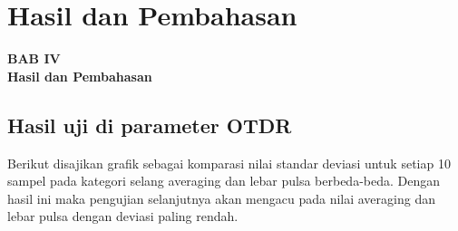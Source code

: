 \documentclass[12pt]{article}
\begin{document}
%	
	
\newpage

	\setcounter{figure}{0}
	
	\section{Hasil dan Pembahasan}
	
	\begin{center}
		{\large \textbf{BAB IV}} \\
		{\large \textbf{Hasil dan Pembahasan}}
	\end{center}
	
	\subsection{Hasil uji di parameter OTDR}
	
	Berikut disajikan grafik sebagai komparasi nilai standar deviasi untuk setiap 10 sampel pada kategori selang averaging dan lebar pulsa berbeda-beda.
	Dengan hasil ini maka pengujian selanjutnya akan mengacu pada nilai averaging dan lebar pulsa dengan deviasi paling rendah.
	
\end{document}

